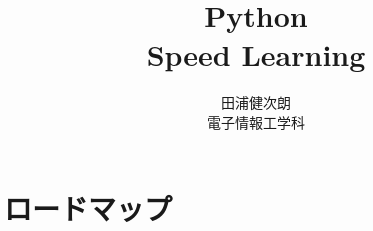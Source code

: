 \documentclass[10pt,dvipdfmx]{beamer}
\title{Python \\ Speed Learning}
\institute{東京大学}
\author{田浦健次朗 \\ 電子情報工学科}
\date{}
\begin{document}
\maketitle





\begin{frame}
\tableofcontents
\end{frame}

\section{ロードマップ}
\end{document}
